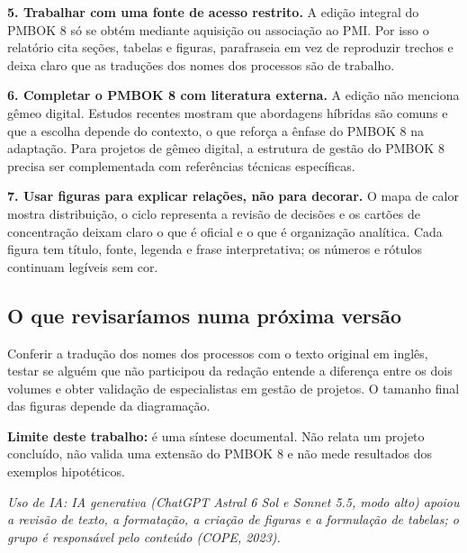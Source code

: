 \documentclass[12pt,a4paper,article,oneside,english,brazil]{abntex2}
\begin{document}
\textbf{5. Trabalhar com uma fonte de acesso restrito.} A edição integral do PMBOK 8 só se obtém mediante aquisição ou associação ao PMI. Por isso o relatório cita seções, tabelas e figuras, parafraseia em vez de reproduzir trechos e deixa claro que as traduções dos nomes dos processos são de trabalho.

\textbf{6. Completar o PMBOK 8 com literatura externa.} A edição não menciona gêmeo digital. Estudos recentes mostram que abordagens híbridas são comuns e que a escolha depende do contexto, o que reforça a ênfase do PMBOK 8 na adaptação. Para projetos de gêmeo digital, a estrutura de gestão do PMBOK 8 precisa ser complementada com referências técnicas específicas.

\textbf{7. Usar figuras para explicar relações, não para decorar.} O mapa de calor mostra distribuição, o ciclo representa a revisão de decisões e os cartões de concentração deixam claro o que é oficial e o que é organização analítica. Cada figura tem título, fonte, legenda e frase interpretativa; os números e rótulos continuam legíveis sem cor.

\subsection*{O que revisaríamos numa próxima versão}

Conferir a tradução dos nomes dos processos com o texto original em inglês, testar se alguém que não participou da redação entende a diferença entre os dois volumes e obter validação de especialistas em gestão de projetos. O tamanho final das figuras depende da diagramação.

\textbf{Limite deste trabalho:} é uma síntese documental. Não relata um projeto concluído, não valida uma extensão do PMBOK 8 e não mede resultados dos exemplos hipotéticos.

\vspace{\onelineskip}
{\footnotesize\SingleSpacing\noindent\textit{Uso de IA: IA generativa (ChatGPT Astral 6 Sol e Sonnet 5.5, modo alto) apoiou a revisão de texto, a formatação, a criação de figuras e a formulação de tabelas; o grupo é responsável pelo conteúdo (COPE, 2023).}\par}
\end{document}
